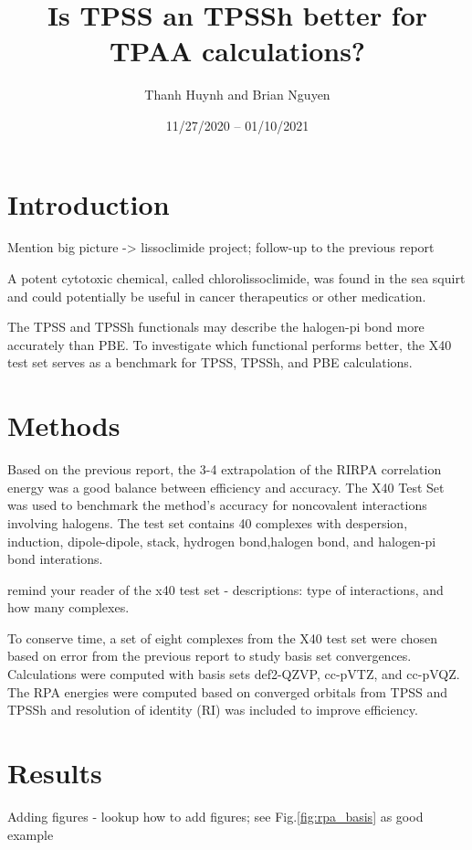 \documentclass[11pt]{article}
\title{\textbf{Is TPSS an TPSSh better for TPAA calculations?}}
\author{Thanh Huynh and Brian Nguyen}
\date{11/27/2020 -- 01/10/2021 }
\newcommand{\brian}[1]{{\color{orange} #1}}
\begin{document}
\maketitle

\section{Introduction}

\brian{Mention big picture -> lissoclimide project; follow-up to the
  previous report}

A potent cytotoxic chemical, called chlorolissoclimide, was found in the
sea squirt and could potentially be useful in cancer therapeutics or
other medication.

The TPSS and TPSSh functionals may describe the halogen-pi bond more
accurately than PBE. To investigate which functional performs better,
the X40 test set serves as a benchmark for TPSS, TPSSh, and PBE 
calculations.  


\section{Methods}

Based on the previous report, the 3-4 extrapolation of the RIRPA
correlation energy was a good balance between efficiency and accuracy.
The X40 Test Set was used to benchmark the method's accuracy for 
noncovalent interactions involving halogens. The test set contains 40
complexes with despersion, induction, dipole-dipole, stack, hydrogen
bond,halogen bond, and halogen-pi bond interations.

\brian{remind your reader of the x40 test set - descriptions: type of
  interactions, and how many complexes}.

To conserve time, a set of eight complexes from the X40 test set were
chosen based on error from the previous report to study basis set
convergences. Calculations were computed with basis sets def2-QZVP,
cc-pVTZ, and cc-pVQZ. The RPA energies were computed based on converged
orbitals from TPSS and TPSSh and resolution of identity (RI) was included
to improve efficiency. 

\section{Results}

\brian{Adding figures - lookup how to add figures; see Fig.\ref{fig:rpa_basis} as good example}
\end{document}
